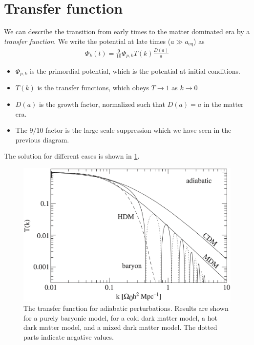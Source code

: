 \section{Transfer function}
We can describe the transition from early times to the matter dominated era by a \emph{transfer function}. We write the potential at late times ($a \gg a_\text{eq}$) as
\begin{align*}
	\Phi_k(t) = \frac{9}{10} \Phi_{p, k} T(k) \frac{D(a)}{a}
\end{align*}
\begin{itemize}
	\item $\Phi_{p, k}$ is the primordial potential, which is the potential at initial conditions.
	\item $T(k)$ is the transfer functions, which obeys $T \to 1$ as $k \to 0$
	\item $D(a)$ is the growth factor, normalized such that $D(a) = a$ in the matter era.
	\item The $9/10$ factor is the large scale suppression which we have seen in the previous diagram.
\end{itemize}
The solution for different cases is shown in \cref{fig:transfer-function}.
\begin{figure}
	\centering
	\includegraphics[width=\textwidth]{img/ch-03/transfer-function.png}
	\caption{The transfer function for adiabatic perturbations. Results are shown for a purely baryonic model, for a cold dark matter model, a hot dark matter model, and a mixed dark matter model. The dotted parts indicate negative values.}
	\label{fig:transfer-function}
\end{figure}

